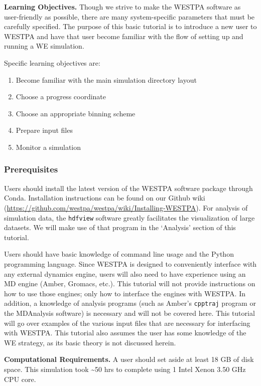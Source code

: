 \documentclass[9pt,tutorial,pubversion]{livecoms}
\begin{document}
\textbf{Learning Objectives.} Though we strive to make the WESTPA software as user-friendly as possible, there are many system-specific parameters that must be carefully specified. 
The purpose of this basic tutorial is to introduce a new user to WESTPA and have that user become familiar with the flow of setting up and running a WE simulation.   

Specific learning objectives are:
\begin{enumerate}
\item Become familiar with the main simulation directory layout
\item Choose a progress coordinate
\item Choose an appropriate binning scheme
\item Prepare input files
\item Monitor a simulation
\end{enumerate}

\subsubsection{Prerequisites}

Users should install the latest version of the WESTPA software package through Conda. 
Installation instructions can be found on our Github wiki (\url{https://github.com/westpa/westpa/wiki/Installing-WESTPA}). 
For analysis of simulation data, the \verb|hdfview| software greatly facilitates the visualization of large datasets. 
We will make use of that program in the ‘Analysis’ section of this tutorial.

Users should have basic knowledge of command line usage and the Python programming language. 
Since WESTPA is designed to conveniently interface with any external dynamics engine, users will also need to have experience using an MD engine (Amber, Gromacs, etc.). 
This tutorial will not provide instructions on how to use those engines; only how to interface the engines with WESTPA. 
In addition, a knowledge of analysis programs (such as Amber’s \verb|cpptraj| program or the MDAnalysis software) is necessary and will not be covered here. 
This tutorial will go over examples of the various input files that are necessary for interfacing with WESTPA. 
This tutorial also assumes the user has some knowledge of the WE strategy, as its basic theory is not discussed herein.

\textbf{Computational Requirements.} A user should set aside at least 18 GB of disk space. 
This simulation took \textasciitilde 50 hrs to complete using 1 Intel Xenon 3.50 GHz CPU core.
\end{document}
